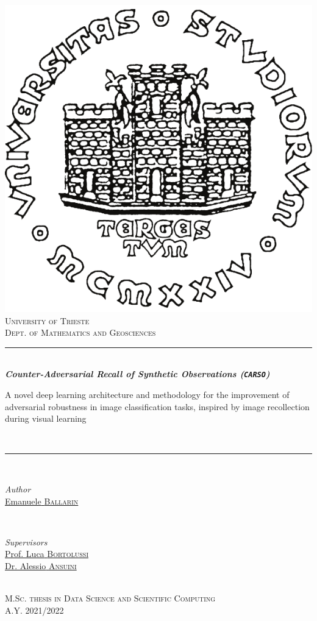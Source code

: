 \begin{titlepage}

    \center

    \vspace*{0.4cm}

    \includegraphics[width=0.30\linewidth]{img/logounits.pdf}
    \\[0.9cm]
    \textsc{\LARGE{University of Trieste}}
    \\
    \Large \textsc{Dept. of Mathematics and Geosciences}
    \\[1.2cm]

    \rule{\linewidth}{0.5mm}
    \\[0.4cm]
    { \huge \bfseries \textit{Counter-Adversarial Recall of Synthetic Observations (\texttt{\textit{CARSO}})}}
    \\[0.4cm]
    \begin{minipage}{0.95\textwidth}
        { \LARGE A novel deep learning architecture and methodology for the improvement of adversarial robustness in image classification tasks, inspired by image recollection during visual learning}
    \end{minipage}
    \\[0.4cm]
    \rule{\linewidth}{0.5mm}
    \\[1.8cm]

    \begin{minipage}{0.4\textwidth}
        \begin{flushleft}
            \Large \emph{{Author}}
            \\
            \href{https://ballarin.cc/}{{Emanuele} \textsc{{Ballarin}}}
        \end{flushleft}
    \end{minipage}
    ~
    \begin{minipage}{0.4\textwidth}
        \begin{flushleft}
            \Large \emph{{Supervisors}}
            \\
            \href{https://aicps.units.it/}{{Prof. Luca} \textsc{{Bortolussi}}}
            \\
                \href{https://www.areasciencepark.it/i-nostri-campus/insediato/?id=ansuini}{{Dr. Alessio} \textsc{{Ansuini}}}
        \end{flushleft}
    \end{minipage}
    \\[2cm]

    \Large \textsc{M.Sc. thesis in Data Science and Scientific Computing
        \\
        A.Y. 2021/2022}
    \vfill

\end{titlepage}
